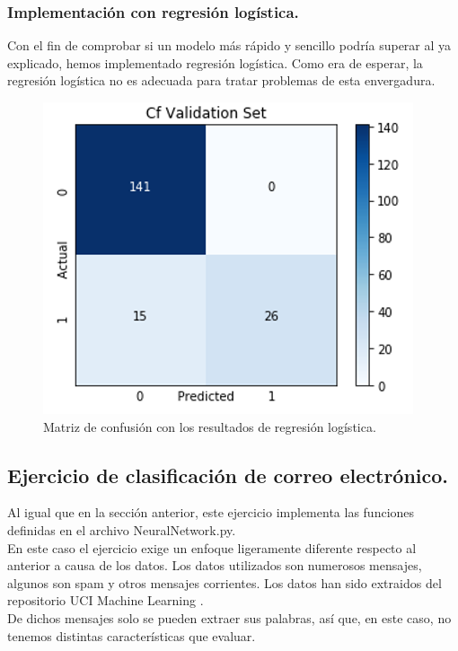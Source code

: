 \documentclass[a4paper,11pt]{article}
\begin{document}
\subsubsection{Implementación con regresión logística.}
Con el fin de comprobar si un modelo más rápido y sencillo podría superar al ya explicado, hemos implementado regresión logística. Como era de esperar, la regresión logística no es adecuada para tratar problemas de esta envergadura.
\begin{figure}[H]
\centering
\includegraphics[scale=0.6]{Annotation 2020-03-23 193133.png}
\caption{Matriz de confusión con los resultados de regresión logística.}
\end{figure}

\subsection{Ejercicio de clasificación de correo electrónico.}
Al igual que en la sección anterior, este ejercicio implementa las funciones definidas en el archivo NeuralNetwork.py.\\ 

\noindent
En este caso el ejercicio exige un enfoque ligeramente diferente respecto al anterior a causa de los datos. Los datos utilizados son numerosos mensajes, algunos son spam y otros mensajes corrientes. Los datos han sido extraidos del repositorio UCI Machine Learning \cite{uci} .\\

\noindent
De dichos mensajes solo se pueden extraer sus palabras, así que, en este caso, no tenemos distintas características que evaluar.
\end{document}
